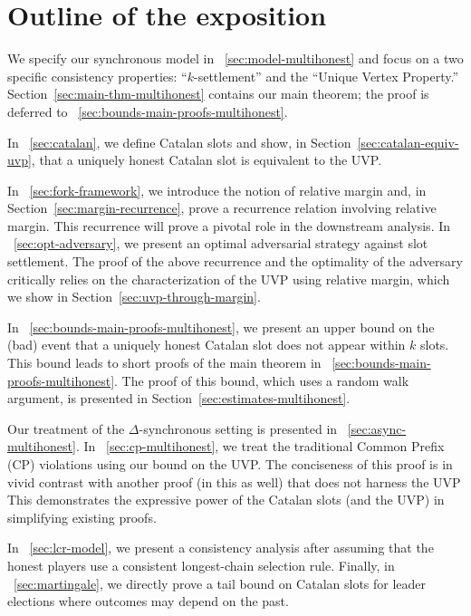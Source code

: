 \section{Outline of the exposition}
We specify our synchronous model in \Section~\ref{sec:model-multihonest} and 
focus on a
two specific consistency properties: ``$k$-settlement'' and the ``Unique Vertex Property.''
Section~\ref{sec:main-thm-multihonest} 
contains our main theorem; the proof is deferred to
\Section~\ref{sec:bounds-main-proofs-multihonest}. 

In \Section~\ref{sec:catalan}, we define Catalan slots and 
show, in Section~\ref{sec:catalan-equiv-uvp}, 
that a uniquely honest Catalan slot is equivalent to the UVP. 

In \Section~\ref{sec:fork-framework}, 
we introduce the notion of relative margin and, 
in Section~\ref{sec:margin-recurrence}, 
prove a recurrence relation involving relative margin. 
This recurrence will prove a pivotal role in the downstream analysis.
In \Section~\ref{sec:opt-adversary}, we 
present an optimal adversarial strategy against slot settlement. 
The proof of the above recurrence and the optimality of the adversary 
critically relies on 
the characterization of the UVP using relative margin,  
which we show in Section~\ref{sec:uvp-through-margin}. 


In \Section~\ref{sec:bounds-main-proofs-multihonest},
we present an upper bound on the (bad) event that
a uniquely honest Catalan slot does not appear within $k$ slots. 
This bound leads to short proofs of the
main theorem in \Section~\ref{sec:bounds-main-proofs-multihonest}. 
The proof of this bound, 
which uses a random walk argument, 
is presented in
Section~\ref{sec:estimates-multihonest}.

Our treatment of the $\Delta$-synchronous setting is
presented in \Section~\ref{sec:async-multihonest}.  
In \Section~\ref{sec:cp-multihonest}, we
treat the traditional Common Prefix (CP) violations using our bound
on the UVP. 
The conciseness of this proof is in vivid contrast with 
another proof (in this \Section as well) 
that does not harness the UVP
This demonstrates the expressive power of the Catalan slots (and the UVP) 
in simplifying existing proofs.

In \Section~\ref{sec:lcr-model}, 
we present a consistency analysis 
after assuming that the honest players use a consistent 
longest-chain selection rule.
Finally, in \Section~\ref{sec:martingale}, 
we directly prove a tail bound on Catalan slots 
for leader elections where 
outcomes may depend on the past.


